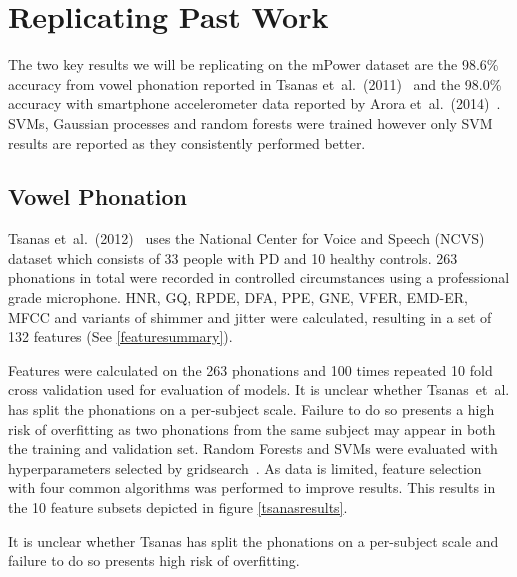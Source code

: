 \documentclass[12pt, twoside]{book}
\begin{document}
\section{Replicating Past Work}
\label{pastwork}
The two key results we will be replicating on the mPower dataset are the 98.6\% accuracy from vowel phonation reported in Tsanas et~al.~(2011)~\cite{tsanas2012novel} and the 98.0\% accuracy with smartphone accelerometer data reported by Arora et~al.~(2014)~\cite{arora2014high}. SVMs, Gaussian processes and random forests were trained however only SVM results are reported as they consistently performed better.

\subsection{Vowel Phonation}
\label{phonationpast}
Tsanas et~al.~(2012)~\cite{tsanas2012novel} uses the National Center for Voice and Speech (NCVS) dataset which consists of 33 people with PD and 10 healthy controls. 263 phonations in total were recorded in controlled circumstances using a professional grade microphone. HNR, GQ, RPDE, DFA, PPE, GNE, VFER, EMD-ER, MFCC and variants of shimmer and jitter were calculated, resulting in a set of 132 features (See \ref{featuresummary}).

Features were calculated on the 263 phonations and 100 times repeated 10 fold cross validation used for evaluation of models. It is unclear whether Tsanas~et~al. has split the phonations on a per-subject scale. Failure to do so presents a high risk of overfitting as two phonations from the same subject may appear in both the training and validation set. Random Forests and SVMs were evaluated with hyperparameters selected by gridsearch~\cite{gridsearch}. As data is limited, feature selection with four common algorithms was performed to improve results. This results in the 10 feature subsets depicted in figure \ref{tsanasresults}.

\begin{highlight}
It is unclear whether Tsanas has split the phonations on a per-subject scale and failure to do so presents high risk of overfitting.
\end{highlight}
\end{document}
